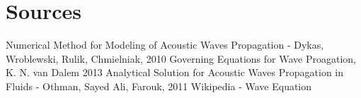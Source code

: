\documentclass{article}
\begin{document}
\section{Sources}
Numerical Method for Modeling of Acoustic Waves Propagation - Dykas, Wroblewski, Rulik, Chmielniak, 2010
Governing Equations for Wave Proagation, K. N. van Dalem 2013
Analytical Solution for Acoustic Waves Propagation in Fluids - Othman, Sayed Ali, Farouk, 2011
Wikipedia - Wave Equation
\end{document}
